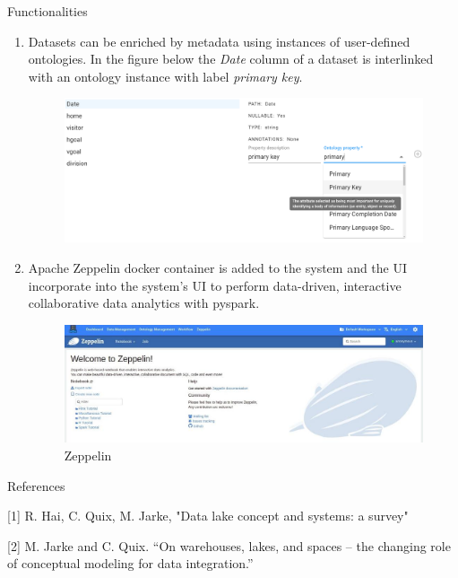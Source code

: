 \documentclass[12pt]{beamer}
\begin{document}
\begin{textblock}{0.5}
\begin{block}{Functionalities}
\begin{enumerate}
\item Datasets can be enriched by metadata using instances of user-defined ontologies. In the figure below the \textit{Date} column of a dataset is interlinked with an ontology instance with label \textit{primary key}.
\begin{figure}[H]
	\includegraphics[width=0.9\linewidth]{annotation.PNG} 
	\label{WorkFlow}
\end{figure}   
    
\item Apache Zeppelin docker container is added to the system and the UI incorporate into the system's UI to perform data-driven,
interactive collaborative data analytics with pyspark.

\begin{figure}[H]
\includegraphics{zeppelin.jpeg}
\caption{Zeppelin} \label{Figure 1}
\end{figure} 
\end{enumerate}

\end{block}

\vfill\vspace{7.5mm} %
\begin{block}{References}
\item{[1] R. Hai, C. Quix, M. Jarke, "Data lake concept and systems: a survey"}
\item{[2] M. Jarke and C. Quix. “On warehouses, lakes, and spaces – the changing role of conceptual modeling for data integration.”}
\end{block}

\end{textblock}
\end{document}
